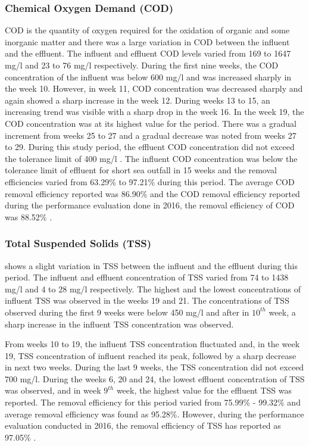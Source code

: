 


\subsubsection{Chemical Oxygen Demand (COD)}
\ac{COD} is the quantity of oxygen required for the oxidation of organic and some inorganic matter \cite{Prasad2020} and there was a large variation in \ac{COD} between the influent and the effluent. The influent and effluent \ac{COD} levels varied from 169 to 1647 mg/l and 23 to 76 mg/l respectively. During the first nine weeks, the \ac{COD} concentration of the influent was below 600 mg/l and was increased sharply in the week 10. However, in week 11, \ac{COD} concentration was decreased sharply and again showed a sharp increase in the week 12. During weeks 13 to 15, an increasing trend was visible with a sharp drop in the week 16. In the week 19, the \ac{COD} concentration was at its highest value for the period.  There was a gradual increment from weeks 25 to 27 and a gradual decrease was noted from weeks 27 to 29. During this study period, the effluent \ac{COD} concentration did not exceed the tolerance limit of 400 mg/l \cite{CEA2022}. The influent \ac{COD} concentration was below the tolerance limit of effluent for short sea outfall in 15 weeks and the removal efficiencies varied from 63.29\% to 97.21\% during this period. The average \ac{COD} removal efficiency reported was 86.90\% and the \ac{COD} removal efficiency reported during the performance evaluation done in 2016, the removal efficiency of \ac{COD} was 88.52\% \cite{Danushika2016}.




\subsubsection{Total Suspended Solids (TSS)}
 shows a slight variation in \ac{TSS} between the influent and the effluent during this period. The influent and effluent concentration of \ac{TSS} varied from 74 to 1438 mg/l and 4 to 28 mg/l respectively. The highest and the lowest concentrations of influent \ac{TSS} was observed in the weeks 19 and 21. The concentrations of \ac{TSS} observed during the first 9 weeks were below 450 mg/l and after in $10^{th}$ week, a sharp increase in the influent \ac{TSS} concentration was observed.

From weeks 10 to 19, the influent \ac{TSS} concentration fluctuated and, in the week 19, \ac{TSS} concentration of influent reached its peak, followed by a sharp decrease in next two weeks. During the last 9 weeks, the \ac{TSS} concentration did not exceed 700 mg/l.  During the weeks 6, 20 and 24, the lowest effluent concentration of \ac{TSS} was observed, and in week $9^{th}$ week, the highest value for the effluent \ac{TSS} was reported. The removal efficiency for this period varied from 75.99\% - 99.32\% and average removal efficiency was found as 95.28\%. However, during the performance evaluation conducted in 2016, the removal efficiency of \ac{TSS} has reported as 97.05\% \cite{Danushika2016}.

